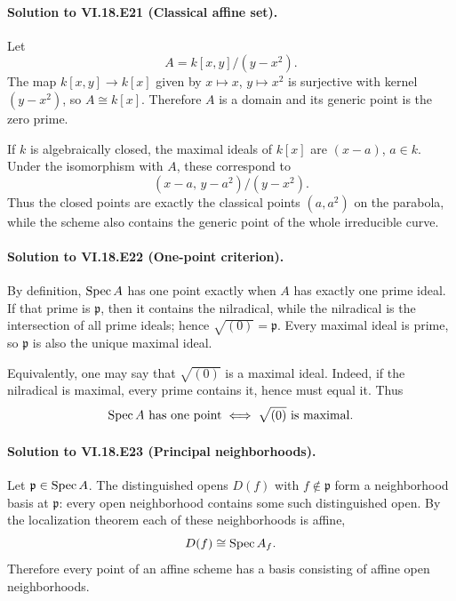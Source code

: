 \paragraph{Solution to VI.18.E21 (Classical affine set).}
\begin{solution}
Let
\[
A=k[x,y]/(y-x^2).
\]
The map $k[x,y]\to k[x]$ given by $x\mapsto x$, $y\mapsto x^2$ is surjective with kernel $(y-x^2)$, so $A\cong k[x]$. Therefore $A$ is a domain and its generic point is the zero prime.

If $k$ is algebraically closed, the maximal ideals of $k[x]$ are $(x-a)$, $a\in k$. Under the isomorphism with $A$, these correspond to
\[
(x-a,\,y-a^2)/(y-x^2).
\]
Thus the closed points are exactly the classical points $(a,a^2)$ on the parabola, while the scheme also contains the generic point of the whole irreducible curve.
\end{solution}

\paragraph{Solution to VI.18.E22 (One-point criterion).}
\begin{solution}
By definition, $\operatorname{Spec} A$ has one point exactly when $A$ has exactly one prime ideal. If that prime is $\mathfrak p$, then it contains the nilradical, while the nilradical is the intersection of all prime ideals; hence $\sqrt{(0)}=\mathfrak p$. Every maximal ideal is prime, so $\mathfrak p$ is also the unique maximal ideal.

Equivalently, one may say that $\sqrt{(0)}$ is a maximal ideal. Indeed, if the nilradical is maximal, every prime contains it, hence must equal it. Thus
\[
\operatorname{Spec} A\text{ has one point}\iff \sqrt{(0)}\text{ is maximal}.
\]
\end{solution}

\paragraph{Solution to VI.18.E23 (Principal neighborhoods).}
\begin{solution}
Let $\mathfrak p\in\operatorname{Spec} A$. The distinguished opens $D(f)$ with $f\notin\mathfrak p$ form a neighborhood basis at $\mathfrak p$: every open neighborhood contains some such distinguished open. By the localization theorem each of these neighborhoods is affine,
\[
D(f)\cong\operatorname{Spec} A_f.
\]
Therefore every point of an affine scheme has a basis consisting of affine open neighborhoods.
\end{solution}


